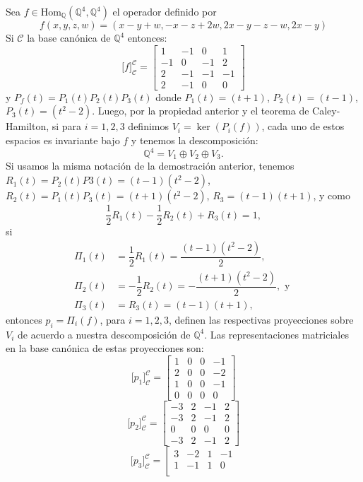 \begin{ejem}
Sea $f\in\textrm{Hom}_{\mathbb{Q}}(\mathbb{Q}^4,\mathbb{Q}^4)$ el operador definido por
$$f(x,y,z,w)=(x-y+w,-x-z+2w,2x-y-z-w,2x-y)$$
Si $\mathcal{C}$ la base can\'onica de $\mathbb{Q}^4$ entonces:
$$\Big[f\Big]_\mathcal{C}^\mathcal{C}=\left[\begin{array}{rrrr}
1 & -1 & 0 & 1\\
-1 & 0 & -1 & 2\\
2 & -1 & -1 & -1\\
2 & -1 & 0 & 0
\end{array}\right]$$
y $P_f(t)=P_1(t)P_2(t)P_3(t)$ donde $P_1(t)=(t+1)$, $P_2(t)=(t-1)$, $P_3(t)=(t^2-2)$. Luego, por la propiedad anterior y el teorema de Caley-Hamilton, si para $i=1,2,3$ definimos $V_i=\ker(P_i(f))$, cada uno de estos espacios es invariante bajo $f$ y tenemos la descomposici\'on:
$$\mathbb{Q}^4=V_1\oplus V_2\oplus V_3.$$
Si usamos la misma notaci\'on de la demostraci\'on anterior, tenemos $R_1(t)=P_2(t)P3(t)=(t-1)(t^2-2)$, $R_2(t)=P_1(t)P_3(t)=(t+1)(t^2-2)$, $R_3=(t-1)(t+1)$, y como
$$\dfrac{1}{2}R_1(t)-\dfrac{1}{2}R_2(t)+R_3(t)=1,$$
si
\begin{align*}
\Pi_1(t) & =\dfrac{1}{2}R_1(t)=\dfrac{(t-1)(t^2-2)}{2},\\
\Pi_2(t) & =-\dfrac{1}{2}R_2(t)=-\dfrac{(t+1)(t^2-2)}{2},\textrm{ y }\\
\Pi_3(t) & =R_3(t)=(t-1)(t+1),
\end{align*}
entonces $p_i=\Pi_i(f)$, para $i=1,2,3$, definen las respectivas proyecciones sobre $V_i$ de acuerdo a nuestra descomposici\'on de $\mathbb{Q}^4$. Las representaciones matriciales en la base can\'onica de estas proyecciones son:
$$\Big[ p_1\Big]_\mathcal{C}^\mathcal{C}=\left[\begin{array}{rrrr}
1 & 0 & 0 & -1\\
2 & 0 & 0 & -2\\
1 & 0 & 0 & -1\\
0 & 0 & 0 & 0
\end{array}\right]$$
$$\Big[ p_2\Big]_\mathcal{C}^\mathcal{C}=\left[\begin{array}{rrrr}
-3 & 2 & -1 & 2\\
-3 & 2 & -1 & 2\\
0 & 0 & 0 & 0\\
-3 & 2 & -1 & 2
\end{array}\right] $$
$$\Big[ p_3\Big]_\mathcal{C}^\mathcal{C}=\left[\begin{array}{rrrr}
3 & -2 & 1 & -1\\
1 & -1 & 1 & 0\\

\end{array}$$
\end{ejem}
